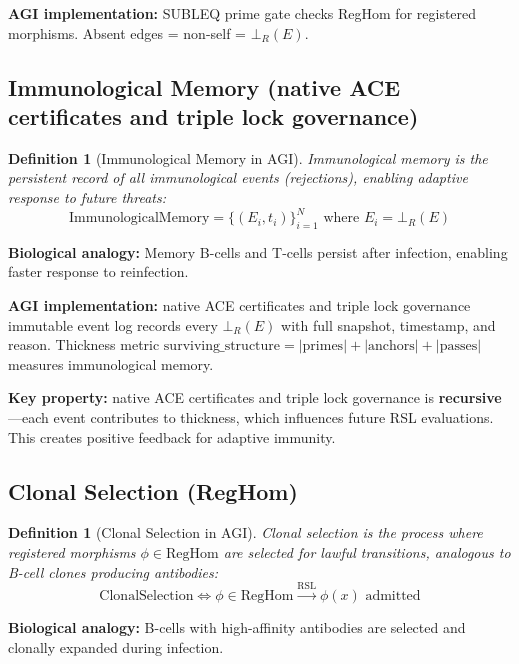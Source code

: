 \documentclass[11pt,a4paper]{article}
\newtheorem{definition}[theorem]{Definition}
\begin{document}
\textbf{AGI implementation:} SUBLEQ prime gate checks RegHom for registered morphisms. Absent edges = non-self = $\bot_R(E)$.

\subsection{Immunological Memory (native ACE certificates and triple lock governance)}

\begin{definition}[Immunological Memory in AGI]
Immunological memory is the persistent record of all immunological events (rejections), enabling adaptive response to future threats:
\begin{equation}
\text{ImmunologicalMemory} = \{(E_i, t_i)\}_{i=1}^N \text{ where } E_i = \bot_R(E)
\end{equation}
\end{definition}

\textbf{Biological analogy:} Memory B-cells and T-cells persist after infection, enabling faster response to reinfection.

\textbf{AGI implementation:} native ACE certificates and triple lock governance immutable event log records every $\bot_R(E)$ with full snapshot, timestamp, and reason. Thickness metric $\text{surviving\_structure} = |\text{primes}| + |\text{anchors}| + |\text{passes}|$ measures immunological memory.

\textbf{Key property:} native ACE certificates and triple lock governance is \textbf{recursive}—each event contributes to thickness, which influences future RSL evaluations. This creates positive feedback for adaptive immunity.

\subsection{Clonal Selection (RegHom)}

\begin{definition}[Clonal Selection in AGI]
Clonal selection is the process where registered morphisms $\phi \in \text{RegHom}$ are selected for lawful transitions, analogous to B-cell clones producing antibodies:
\begin{equation}
\text{ClonalSelection} \iff \phi \in \text{RegHom} \xrightarrow{\text{RSL}} \phi(x) \text{ admitted}
\end{equation}
\end{definition}

\textbf{Biological analogy:} B-cells with high-affinity antibodies are selected and clonally expanded during infection.
\end{document}
